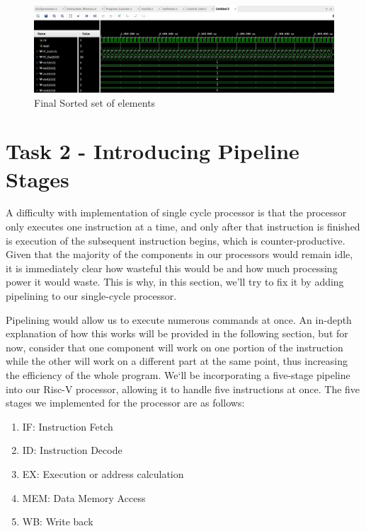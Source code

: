 \documentclass{article}
\begin{document}
\begin{figure}[h]
    \centering
    \includegraphics*[width = 13 cm]{final_sorted.jpeg}
    \caption{Final Sorted set of elements}
    \label{fig: label 3}
\end{figure}

\section{Task 2 - Introducing Pipeline Stages}

A difficulty with implementation of single cycle processor is that the processor only executes one instruction at a time, and only after that instruction is finished is execution of the subsequent instruction begins, which is counter-productive. Given that the majority of the components in our processors would remain idle, it is immediately clear how wasteful this would be and how much processing power it would waste. This is why, in this section, we'll try to fix it by adding pipelining to our single-cycle processor.

Pipelining would allow us to execute numerous commands at once. An in-depth explanation of how this works will be provided in the following section, but for now, consider that one component will work on one portion of the instruction while the other will work on a different part at the same point, thus increasing the efficiency of the whole program. We`ll be incorporating a five-stage pipeline into our Risc-V processor, allowing it to handle five instructions at once. The five stages we implemented for the processor are as follows:

\begin{enumerate}
    \item IF: Instruction Fetch
    \item ID: Instruction Decode 
    \item EX: Execution or address calculation
    \item MEM: Data Memory Access
    \item WB: Write back

\end{enumerate}
\end{document}

